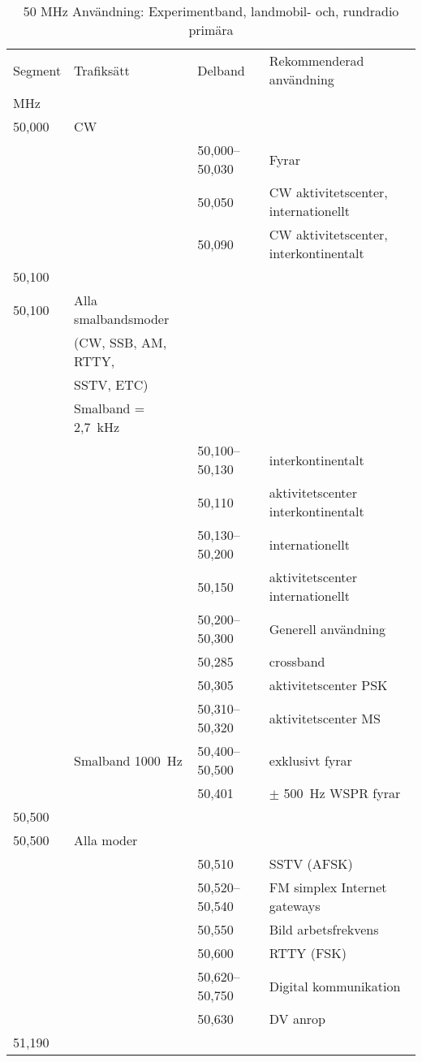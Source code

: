 \begin{table}[h]
\caption{50 MHz Användning: Experimentband, landmobil- och, rundradio primära}
\begin{xtabular}{llll}
Segment & Trafiksätt & Delband & Rekommenderad användning \\
MHz     &            &         & \\ \hline
50,000 & CW &                 & \\
       &    & 50,000--50,030 & Fyrar\\
       &    & 50,050          & CW aktivitetscenter, internationellt\\
       &    & 50,090          & CW aktivitetscenter, interkontinentalt\\
50,100 &    &                 & \\ \hline

50,100 & Alla smalbandsmoder & &\\
       & (CW, SSB, AM, RTTY, & &\\
       & SSTV, ETC)          & &\\
       & Smalband = 2,7~kHz  & &\\
       & & 50,100--50,130 & interkontinentalt\\
       & & 50,110 & aktivitetscenter interkontinentalt\\
       & & 50,130--50,200 & internationellt\\
       & & 50,150 & aktivitetscenter internationellt\\
       & & 50,200--50,300 & Generell användning\\
       & & 50,285 & crossband\\
       & & 50,305 & aktivitetscenter PSK\\
       & & 50,310--50,320 & aktivitetscenter MS\\
       & Smalband 1000~Hz & 50,400--50,500 & exklusivt fyrar\\
       & & 50,401 & \(\pm\) 500~Hz WSPR fyrar\\
50,500 &    &                 & \\ \hline

50,500 & Alla moder & & \\
       & & 50,510 & SSTV (AFSK)\\
       & & 50,520--50,540 & FM simplex Internet gateways\\
       & & 50,550 & Bild arbetsfrekvens\\
       & & 50,600 & RTTY (FSK)\\
       & & 50,620--50,750 & Digital kommunikation\\
       & & 50,630 & DV anrop\\
51,190 &    &   & \\ \hline


\end{xtabular}
\end{table}
